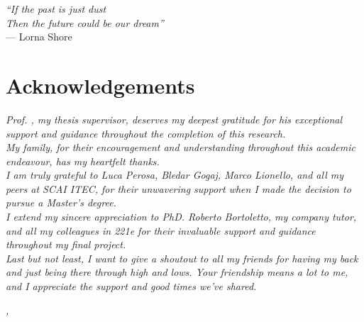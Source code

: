 \cleardoublepage
{}
{}

\begin{flushright}{
    \slshape
    ``If the past is just dust \\
    Then the future could be our dream''} \\
    \medskip
    --- Lorna Shore
\end{flushright}


\bigskip

\begingroup
\let\clearpage\relax
\let\cleardoublepage\relax
\let\cleardoublepage\relax

\chapter*{Acknowledgements}

\noindent \textit{Prof. \myProf, my thesis supervisor, deserves my deepest gratitude for his exceptional support and guidance throughout the completion of this research.}\\
\noindent \textit{My family, for their encouragement and understanding throughout this academic endeavour, has my heartfelt thanks.}\\
\noindent \textit{I am truly grateful to Luca Perosa, Bledar Gogaj, Marco Lionello, and all my peers at SCAI ITEC, for their unwavering support when I made the decision to pursue a Master’s degree.}\\
\noindent \textit{I extend my sincere appreciation to PhD. Roberto Bortoletto, my company tutor, and all my colleagues in 221e for their invaluable support and guidance throughout my final project.}\\
\noindent \textit{Last but not least, I want to give a shoutout to all my friends for having my back and just being there through high and lows. Your friendship means a lot to me, and I appreciate the support and good times we've shared.}\\
\bigskip

\noindent\textit{\myLocation, \myTime}
\hfill \myName

\endgroup
